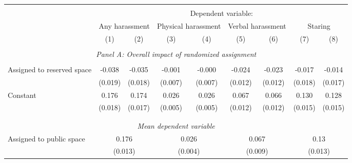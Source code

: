 \begin{tabular}{l*{8}{c}} \hline\hline \\[-1.8ex] & \multicolumn{8}{c}{Dependent variable: } \\ 
                    &\multicolumn{2}{c}{Any harassment}         &\multicolumn{2}{c}{Physical harassment}    &\multicolumn{2}{c}{Verbal harassment}      &\multicolumn{2}{c}{Staring}                \\\cmidrule(lr){2-3}\cmidrule(lr){4-5}\cmidrule(lr){6-7}\cmidrule(lr){8-9}
                    &\multicolumn{1}{c}{(1)}         &\multicolumn{1}{c}{(2)}         &\multicolumn{1}{c}{(3)}         &\multicolumn{1}{c}{(4)}         &\multicolumn{1}{c}{(5)}         &\multicolumn{1}{c}{(6)}         &\multicolumn{1}{c}{(7)}         &\multicolumn{1}{c}{(8)}         \\
 \hline \\[-1ex] \multicolumn{9}{c}{\textit{Panel A: Overall impact of randomized assignment}} \\\\[-1ex]
Assigned to reserved space&      -0.038\sym{**} &      -0.035\sym{*}  &      -0.001         &      -0.000         &      -0.024\sym{*}  &      -0.023\sym{*}  &      -0.017         &      -0.014         \\
                    &     (0.019)         &     (0.018)         &     (0.007)         &     (0.007)         &     (0.012)         &     (0.012)         &     (0.018)         &     (0.017)         \\
[1em]
Constant            &       0.176\sym{***}&       0.174\sym{***}&       0.026\sym{***}&       0.026\sym{***}&       0.067\sym{***}&       0.066\sym{***}&       0.130\sym{***}&       0.128\sym{***}\\
                    &     (0.018)         &     (0.017)         &     (0.005)         &     (0.005)         &     (0.012)         &     (0.012)         &     (0.015)         &     (0.015)         \\
\\[-1.8ex] \hline \\[-1.8ex] \multicolumn{9}{c}{\textit{Mean dependent variable}} \\ Assigned to public space & \multicolumn{2}{c}{0.176} & \multicolumn{2}{c}{0.026} & \multicolumn{2}{c}{0.067} & \multicolumn{2}{c}{0.13} \\ \, & \multicolumn{2}{c}{(0.013)} & \multicolumn{2}{c}{(0.004)} & \multicolumn{2}{c}{(0.009)} & \multicolumn{2}{c}{(0.013)} \\ 


\end{tabular}
